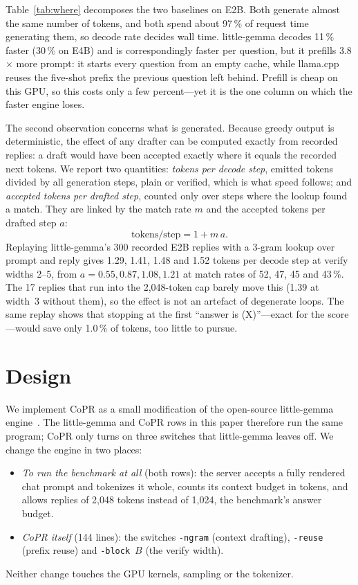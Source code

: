 \documentclass[lettersize,journal]{IEEEtran}
\newcommand{\sys}{CoPR}
\newcommand{\lc}{llama.cpp}
\newcommand{\lgm}{little-gemma}
\begin{document}
Table~\ref{tab:where} decomposes the two baselines on E2B. Both generate almost
the same number of tokens, and both spend about 97\,\% of request time
generating them, so decode rate decides wall time. \lgm{} decodes 11\,\% faster
(30\,\% on E4B) and is correspondingly faster per question, but it prefills
3.8$\times$ more prompt: it starts every question from an empty cache, while
\lc{} reuses the five-shot prefix the previous question left behind. Prefill
is cheap on this GPU, so this costs only a few percent---yet it is the one
column on which the faster engine loses.

The second observation concerns what is generated. Because greedy output is
deterministic, the effect of any drafter can be computed exactly from recorded
replies: a draft would have been accepted exactly where it equals the recorded
next tokens. We report two quantities: \emph{tokens per decode step}, emitted
tokens divided by all generation steps, plain or verified, which is what
speed follows; and \emph{accepted tokens per drafted step}, counted only over
steps where the lookup found a match. They are linked by the match rate $m$
and the accepted tokens per drafted step $a$:
\begin{equation}
\text{tokens/step} = 1 + m\,a .
\end{equation}
Replaying
\lgm{}'s 300 recorded E2B replies with a 3-gram lookup over prompt and reply
gives 1.29, 1.41, 1.48 and 1.52 tokens per decode step at verify widths 2--5,
from $a = 0.55, 0.87, 1.08, 1.21$ at match rates of 52, 47, 45 and 43\,\%. The 17 replies that
run into the 2{,}048-token cap barely move this (1.39 at width~3 without them),
so the effect is not an artefact of degenerate loops. The same replay shows
that stopping at the first ``answer is (X)''---exact for the score---would save
only 1.0\,\% of tokens, too little to pursue.

\section{Design}\label{sec:design}

We implement \sys{} as a small modification of the open-source \lgm{}
engine~\cite{littlegemmarepo}. The \lgm{} and \sys{} rows in this paper therefore run the
same program; \sys{} only turns on three switches that \lgm{} leaves off. We
change the engine in two places:
\begin{itemize}
\item \emph{To run the benchmark at all} (both rows): the server
accepts a fully rendered chat prompt and tokenizes it whole, counts its context
budget in tokens, and allows replies of 2{,}048 tokens instead of 1{,}024, the
benchmark's answer budget.
\item \emph{\sys{} itself} (144 lines): the switches \texttt{-ngram} (context
drafting), \texttt{-reuse} (prefix reuse) and \texttt{-block}~$B$ (the verify
width).
\end{itemize}
Neither change touches the GPU kernels, sampling or the tokenizer.
\end{document}
